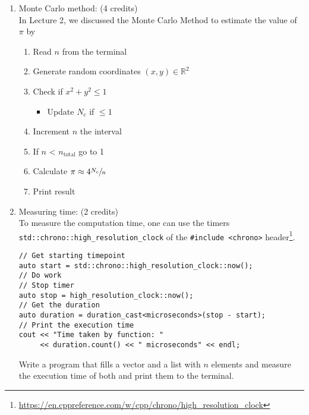 \documentclass[11pt]{article}
\begin{document}
\begin{enumerate}

\item Monte Carlo method: (4 credits)\\
In Lecture 2, we discussed the Monte Carlo Method to estimate the value of $\pi$ by
\begin{enumerate}
\item Read $n$ from the terminal
\item Generate random coordinates $(x,y)\in \mathbb{R}^2$
\item Check if $x^2+y^2 \leq 1$
\begin{itemize}
\item Update $N_c$ if $\leq 1$
\end{itemize}
\item Increment $n$ the interval  
\item If $n$ < $n_{\text{total}}$ go to 1
\item Calculate $\pi \approx 4 \sfrac{N_c}{n}$
\item Print result
\end{enumerate}

\item Measuring time: (2 credits)\\
To measure the computation time, one can use the timers \lstinline|std::chrono::high_resolution_clock| of the \lstinline|#include <chrono>| header\footnote{\url{https://en.cppreference.com/w/cpp/chrono/high_resolution_clock}}.
\begin{lstlisting}
// Get starting timepoint 
auto start = std::chrono::high_resolution_clock::now(); 
// Do work
// Stop timer
auto stop = high_resolution_clock::now();
// Get the duration
auto duration = duration_cast<microseconds>(stop - start); 
// Print the execution time  
cout << "Time taken by function: "
     << duration.count() << " microseconds" << endl; 
\end{lstlisting} 
Write a program that fills a vector and a list with $n$ elements and measure the execution time of both and print them to the terminal. 


\end{enumerate}

\doclicenseThis 
\end{document}
